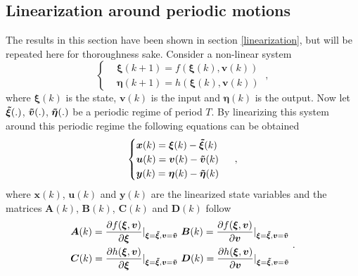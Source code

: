 \subsection{Linearization around periodic motions}
The results in this section have been shown in section \ref{linearization}, but will be repeated here for thoroughness sake.
Consider a non-linear system 
\begin{equation} \label{eq:4.1}
\begin{cases}
      &\boldsymbol{\xi}(k+1)=f(\boldsymbol{\xi}(k), \boldsymbol{v}(k))\\
      &\boldsymbol{\eta}(k+1)=h(\boldsymbol{\xi}(k), \boldsymbol{v}(k))
\end{cases} \ ,
\end{equation}
where $\boldsymbol{\xi}(k)$ is the state, $\boldsymbol{v}(k)$ is the input and $\boldsymbol{\eta}(k)$ is the output.
Now let $\boldsymbol{\Tilde{\xi}}(.)$, $\boldsymbol{\Tilde{v}}(.)$, $\boldsymbol{\Tilde{\eta}}(.)$ be a periodic regime of period $T$. By linearizing this system around this periodic regime the following equations can be obtained
\begin{equation} \label{eq:4.2} 
    \begin{cases}
      \boldsymbol{x}(k)=\boldsymbol{\xi}(k)-\boldsymbol{\Tilde{\xi}}(k)\\
      \boldsymbol{u}(k)=\boldsymbol{v}(k)-\boldsymbol{\Tilde{v}}(k)\\
      \boldsymbol{y}(k)=\boldsymbol{\eta}(k)-\boldsymbol{\Tilde{\eta}}(k)
    \end{cases} \ ,  
\end{equation}
where $\boldsymbol{x}(k)$, $\boldsymbol{u}(k)$ and $\boldsymbol{y}(k)$ are the linearized state variables and the matrices $\boldsymbol{A}(k)$, $\boldsymbol{B}(k)$, $\boldsymbol{C}(k)$ and $\boldsymbol{D}(k)$ follow
\begin{equation} \label{eq:4.3}
\begin{split}
      &\boldsymbol{A}(k)=\frac{\partial f(\boldsymbol{\xi},\boldsymbol{v})}{\partial \boldsymbol{\xi}}|_{\boldsymbol{\xi}=\boldsymbol{\Tilde{\xi}},\boldsymbol{v}=\boldsymbol{\Tilde{v}}}\ 
      \boldsymbol{B}(k)=\frac{\partial f(\boldsymbol{\xi},\boldsymbol{v})}{\partial \boldsymbol{v}}|_{\boldsymbol{\xi}=\boldsymbol{\Tilde{\xi}},\boldsymbol{v}=\boldsymbol{\Tilde{v}}}\\
      &\boldsymbol{C}(k)=\frac{\partial h(\boldsymbol{\xi},\boldsymbol{v})}{\partial \boldsymbol{\xi}}|_{\boldsymbol{\xi}=\boldsymbol{\Tilde{\xi}},\boldsymbol{v}=\boldsymbol{\Tilde{v}}} \
      \boldsymbol{D}(k)=\frac{\partial h(\boldsymbol{\xi},\boldsymbol{v})}{\partial \boldsymbol{v}}|_{\boldsymbol{\xi}=\boldsymbol{\Tilde{\xi}},\boldsymbol{v}=\boldsymbol{\Tilde{v}}}
\end{split} \ .
\end{equation}
